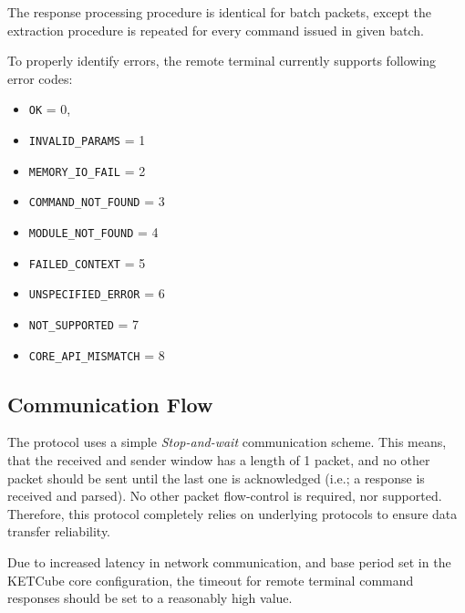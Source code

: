 The response processing procedure is identical for batch packets, except the extraction procedure is repeated for every command issued in given batch.

To properly identify errors, the remote terminal currently supports following error codes:

\begin{itemize}
  \item \texttt{OK} = 0,
  \item \texttt{INVALID\_PARAMS} = 1
  \item \texttt{MEMORY\_IO\_FAIL} = 2
  \item \texttt{COMMAND\_NOT\_FOUND} = 3
  \item \texttt{MODULE\_NOT\_FOUND} = 4
  \item \texttt{FAILED\_CONTEXT} = 5
  \item \texttt{UNSPECIFIED\_ERROR} = 6
  \item \texttt{NOT\_SUPPORTED} = 7
  \item \texttt{CORE\_API\_MISMATCH} = 8
\end{itemize}

\subsection{Communication Flow}

The protocol uses a simple \textit{Stop-and-wait} communication scheme. This means, that the received and sender window has a length of 1 packet, and no other packet should be sent until the last one is acknowledged (i.e.; a response is received and parsed). No other packet flow-control is required, nor supported. Therefore, this protocol completely relies on underlying protocols to ensure data transfer reliability.

Due to increased latency in network communication, and base period set in the KETCube core configuration, the timeout for remote terminal command responses should be set to a reasonably high value. 

  
  




  




